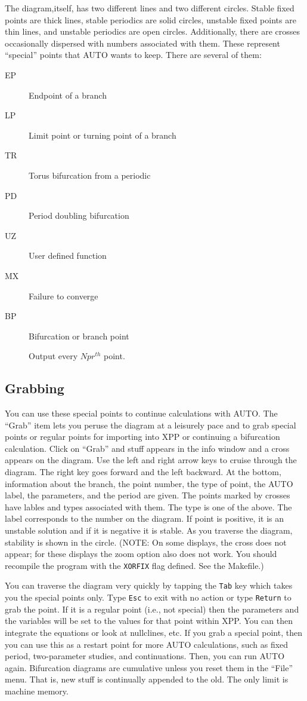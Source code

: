 \documentclass{article}
\begin{document}
The diagram,itself, has two different lines and two different circles.
Stable fixed points are thick lines, stable periodics are solid
circles, unstable fixed points are thin lines, and unstable periodics
are open circles. Additionally, there are crosses occasionally
dispersed with numbers associated with them.  These represent
``special'' points that AUTO wants to keep.  There are several of
them:
\begin{description}
\item[EP] Endpoint of a branch
\item[LP] Limit point or turning point of a branch
\item[TR] Torus bifurcation from a periodic
\item[PD] Period doubling bifurcation
\item[UZ] User defined function
\item[MX] Failure to converge
\item[BP] Bifurcation or branch point
\item[  ] Output every $Npr^{th}$ point.
\end{description}

\subsection{Grabbing}

You can use these special points to continue calculations with AUTO.
The ``Grab'' item lets you peruse the diagram at a leisurely pace and
to grab special points or regular points for importing into XPP or
continuing a bifurcation calculation.  Click on ``Grab'' and stuff
appears in the info window and a cross appears on the diagram.  Use
the left and right arrow keys to cruise through the diagram. The right
key goes forward and the left backward.  At the bottom, information
about the branch, the point number, the type of point, the AUTO label,
the parameters, and the period are given. The points marked by crosses
have lables and types associated with them.  The type is one of the
above.  The label corresponds to the number on the diagram.  If point
is positive, it is an unstable solution and if it is negative it is
stable. As you traverse the diagram, stability is shown in the circle.
(NOTE: On some displays, the cross does not appear; for these displays
the zoom option also does not work.  You should recompile the program
with the {\tt XORFIX} flag defined.  See the Makefile.)

You can traverse the diagram very quickly by tapping the {\tt Tab} key
which takes you the special points only.  Type {\tt Esc} to exit with
no action or type {\tt Return} to grab the point.  If it is a regular
point (i.e., not special) then the parameters and the variables will
be set to the values for that point within XPP.  You can then
integrate the equations or look at nullclines, etc.  If you grab a
special point, then you can use this as a restart point for more AUTO
calculations, such as fixed period, two-parameter studies, and
continuations. Then, you can run AUTO again.  Bifurcation diagrams are
cumulative unless you reset them in the ``File'' menu.  That is, new
stuff is continually appended to the old.  The only limit is machine
memory.
\end{document}
